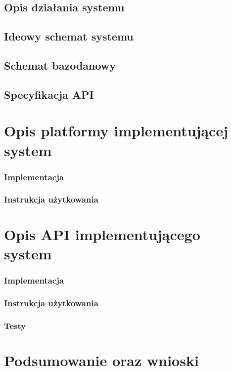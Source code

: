 \documentclass[12pt]{report}
\begin{document}
         \section{Opis działania systemu}
         \section{Ideowy schemat systemu}
         \section{Schemat bazodanowy}
         \section{Specyfikacja API}
    \chapter{Opis platformy implementującej system}
        \subsection{Implementacja}
        \subsection{Instrukcja użytkowania}
    \chapter{Opis API implementującego system}
        \subsection{Implementacja}
        \subsection{Instrukcja użytkowania}
        \subsection{Testy}
    \chapter{Podsumowanie oraz wnioski}
    \listoffigures
    
\end{document}
